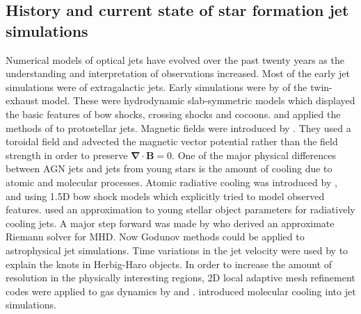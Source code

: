 \subsection{History and current state of star formation jet simulations}
\label{StateOfTheArt}
Numerical models of optical jets have evolved over the past twenty years as the understanding and interpretation of observations increased. 
Most of the early jet simulations were of extragalactic jets.
Early simulations were by \citet{1981ApJ...247...52N} of the \citet{1974MNRAS.169..395B} twin-exhaust model. These were hydrodynamic slab-symmetric models which displayed the basic features of bow shocks, crossing shocks and cocoons.
\citet{1983ApJ...274..677P} and \citet{1986ApJ...301..571P} applied the methods of \citet{1981ApJ...247...52N} to protostellar jets.
Magnetic fields were introduced by \citet{1986ApJ...311L..63C}. They used a toroidal field and advected the magnetic vector potential rather than the field strength in order to preserve $\boldsymbol{\nabla} \cdot \mathbf{B} =0$.
One of the major physical differences between AGN jets and jets from young stars is the amount of cooling due to atomic and molecular processes.
Atomic radiative cooling was introduced by
\citet{1984ApJ...276..560H}, \citet{1987ApJ...316..323H} and \citet{1988ApJ...326..323R} using 1.5D bow shock models which explicitly tried to model observed features.
\citet{1990ApJ...360..370B} used an approximation to young stellar object parameters for radiatively cooling jets.
A major step forward was made by \citet{1988JCoPh..75..400B} who derived an approximate Riemann solver for MHD. Now Godunov methods could be applied to astrophysical jet simulations.
Time variations in the jet velocity were used by \citet{1990ApJ...364..601R}
to explain the knots in Herbig-Haro objects.
In order to increase the amount of resolution in the physically interesting regions, 2D local adaptive mesh refinement codes were applied to gas dynamics by \citet{1993MNRAS.261..573F} and \citet{1994ApJ...420..213K}.
\citet{1995A&A...296..833R} introduced molecular cooling into jet simulations.
